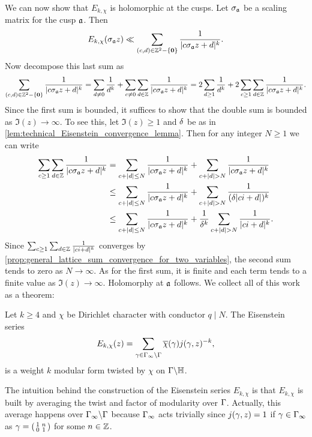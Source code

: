       We can now show that $E_{k,\chi}$ is holomorphic at the cusps. Let $\sigma_{\mathfrak{a}}$ be a scaling matrix for the cusp $\mathfrak{a}$. Then
      \[
        E_{k,\chi}(\sigma_{\mathfrak{a}}z) \ll \sum_{(c,d) \in \mathbb{Z}^{2}-\{\mathbf{0}\}}\frac{1}{|c\sigma_{\mathfrak{a}}z+d|^{k}}.
      \]
      Now decompose this last sum as
      \[
        \sum_{(c,d) \in \mathbb{Z}^{2}-\{\mathbf{0}\}}\frac{1}{|c\sigma_{\mathfrak{a}}z+d|^{k}} = \sum_{d \neq 0}\frac{1}{d^{k}}+\sum_{c \neq 0}\sum_{d \in \mathbb{Z}}\frac{1}{|c\sigma_{\mathfrak{a}}z+d|^{k}} = 2\sum_{d \ge 1}\frac{1}{d^{k}}+2\sum_{c \ge 1}\sum_{d \in \mathbb{Z}}\frac{1}{|c\sigma_{\mathfrak{a}}z+d|^{k}}.
      \]
      Since the first sum is bounded, it suffices to show that the double sum is bounded as $\Im(z) \to \infty$. To see this, let $\Im(z) \ge 1$ and $\delta$ be as in \cref{lem:technical_Eisenstein_convergence_lemma}. Then for any integer $N \ge 1$ we can write
      \begin{align*}
        \sum_{c \ge 1}\sum_{d \in \mathbb{Z}}\frac{1}{|c\sigma_{\mathfrak{a}}z+d|^{k}} &= \sum_{c+|d| \le N}\frac{1}{|c\sigma_{\mathfrak{a}}z+d|^{k}}+\sum_{c+|d| > N}\frac{1}{|c\sigma_{\mathfrak{a}}z+d|^{k}} \\
        &\le \sum_{c+|d| \le N}\frac{1}{|c\sigma_{\mathfrak{a}}z+d|^{k}}+\sum_{c+|d| > N}\frac{1}{(\delta|ci+d|)^{k}} \\
        &\le \sum_{c+|d| \le N}\frac{1}{|c\sigma_{\mathfrak{a}}z+d|^{k}}+\frac{1}{\delta^{k}}\sum_{c+|d| > N}\frac{1}{|ci+d|^{k}}.
      \end{align*}
      Since $\sum_{c \ge 1}\sum_{d \in \mathbb{Z}}\frac{1}{|ci+d|^{k}}$ converges by \cref{prop:general_lattice_sum_convergence_for_two_variables}, the second sum tends to zero as $N \to \infty$. As for the first sum, it is finite and each term tends to a finite value as $\Im(z) \to \infty$. Holomorphy at $\mathfrak{a}$ follows. We collect all of this work as a theorem:

      \begin{theorem}
        Let $k \ge 4$ and $\chi$ be Dirichlet character with conductor $q \mid N$. The Eisenstein series
        \[
          E_{k,\chi}(z) = \sum_{\gamma \in \Gamma_{\infty}\backslash\Gamma}\overline{\chi}(\gamma)j(\gamma,z)^{-k},
        \]
        is a weight $k$ modular form twisted by $\chi$ on $\Gamma\backslash\mathbb{H}$.
      \end{theorem}

      \begin{remark}
        The intuition behind the construction of the Eisenstein series $E_{k,\chi}$ is that $E_{k,\chi}$ is built by averaging the twist and factor of modularity over $\Gamma$. Actually, this average happens over $\Gamma_{\infty}\backslash\Gamma$ because $\Gamma_{\infty}$ acts trivially since $j(\gamma,z) = 1$ if $\gamma \in \Gamma_{\infty}$ as $\gamma = \begin{psmallmatrix} 1 & n \\ 0 & 1 \end{psmallmatrix}$ for some $n \in \mathbb{Z}$.
      \end{remark}

